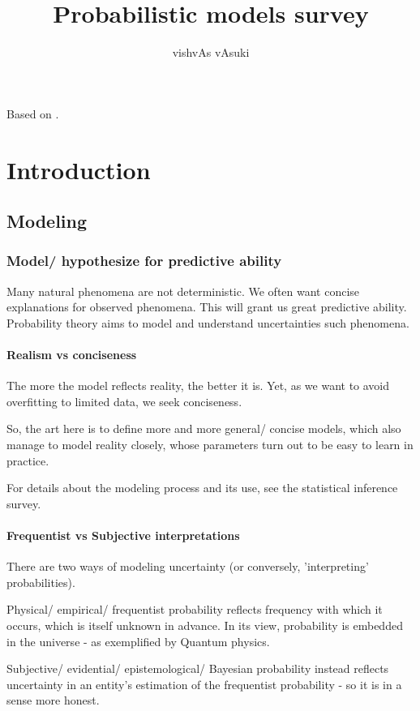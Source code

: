 \documentclass[oneside, article]{memoir}
\title{Probabilistic models survey}
\author{vishvAs vAsuki}
\begin{document}
\maketitle

Based on \cite{mitzenmacherUpfal}.

\tableofcontents
\part{Introduction}
\chapter{Modeling}
\section{Model/ hypothesize for predictive ability}
Many natural phenomena are not deterministic. We often want concise explanations for observed phenomena. This will grant us great predictive ability. Probability theory aims to model and understand uncertainties such phenomena.

\subsection{Realism vs conciseness}
The more the model reflects reality, the better it is. Yet, as we want to avoid overfitting to limited data, we seek conciseness.

So, the art here is to define more and more general/ concise models, which also manage to model reality closely, whose parameters turn out to be easy to learn in practice.

For details about the modeling process and its use, see the statistical inference survey.

\subsection{Frequentist vs Subjective interpretations}
There are two ways of modeling uncertainty (or conversely, 'interpreting' probabilities).

Physical/ empirical/ frequentist probability reflects frequency with which it occurs, which is itself unknown in advance. In its view, probability is embedded in the universe - as exemplified by Quantum physics.

Subjective/ evidential/ epistemological/ Bayesian probability instead reflects uncertainty in an entity's estimation of the frequentist probability - so it is in a sense more honest.
\end{document}
